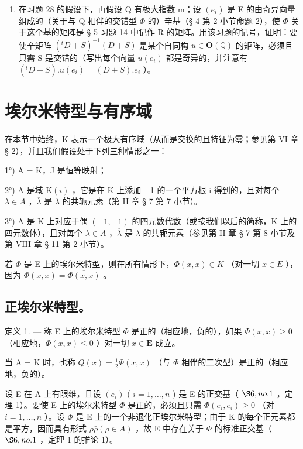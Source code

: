 \begin{enumerate}
\def\labelenumi{\arabic{enumi})}
\setcounter{enumi}{28}
\tightlist
\item
  在习题 28 的假设下，再假设 Q 有极大指数 m；设 \((e_{i})\) 是 E 的由奇异向量组成的（关于与 Q 相伴的交错型 \(\Phi\) 的）辛基（§ 4 第 2 小节命题 2），使 \(\Phi\) 关于这个基的矩阵是 § 5 习题 14 中记作 R 的矩阵。用该习题的记号，证明：要使辛矩阵 \((^{t}D + S)^{-1}(D + S)\) 是某个自同构 \(u \in \mathbf{O}(\mathbb{Q})\) 的矩阵，必须且只需 S 是交错的（写出每个向量 \(u(e_{i})\) 都是奇异的，并注意有 \((^{t}D + S).u(e_{i}) = (D + S).e_{i}\) ）。
\end{enumerate}

\section{埃尔米特型与有序域}

在本节中始终，K 表示一个极大有序域（从而是交换的且特征为零；参见第 VI 章 § 2），并且我们假设处于下列三种情形之一：

1°) A = K，J 是恒等映射；

2°) A 是域 \(\mathrm{K}(i)\) ，它是在 K 上添加 −1 的一个平方根 i 得到的，且对每个 \(\lambda \in A\) ，\(\overline{\lambda}\) 是 \(\lambda\) 的共轭元素（第 II 章 § 7 第 7 小节）。

3°) A 是 K 上对应于偶 \((-1,-1)\) 的四元数代数（或按我们以后的简称，K 上的四元数体），且对每个 \(\lambda\in A\) ，\(\overline{\lambda}\) 是 \(\lambda\) 的共轭元素（参见第 II 章 § 7 第 8 小节及第 VIII 章 § 11 第 2 小节）。

若 \(\Phi\) 是 E 上的埃尔米特型，则在所有情形下，\(\Phi(x, x) \in K\) （对一切 \(x \in E\) ），因为 \(\Phi(x, x) = \overline{\Phi(x, x)}\) 。

\subsection{正埃尔米特型。}

定义 1. --- 称 E 上的埃尔米特型 \(\Phi\) 是正的（相应地，负的），如果 \(\Phi(x, x) \geqslant 0\) （相应地，\(\Phi(x, x) \leqslant 0\) ）对一切 \(x \in \mathbf{E}\) 成立。

当 A = K 时，也称 \(Q(x) = \frac{1}{2} \Phi(x, x)\) （与 \(\Phi\) 相伴的二次型）是正的（相应地，负的）。

设 E 在 A 上有限维，且设 \((e_{i})\) ( \(i = 1, \ldots, n\) ) 是 E 的正交基（ \(\S 6, no. 1\) ，定理 1）。要使 E 上的埃尔米特型 \(\Phi\) 是正的，必须且只需 \(\Phi(e_{i}, e_{i}) \geqslant 0\) （对 \(i = 1, \ldots, n\) ）。设 \(\Phi\) 是 E 上的一个非退化正埃尔米特型；由于 K 的每个正元素都是平方，因而具有形式 \(\rho\bar{\rho} (\rho \in A)\) ，故 E 中存在关于 \(\Phi\) 的标准正交基（ \(\S 6, no. 1\) ，定理 1 的推论 1）。

